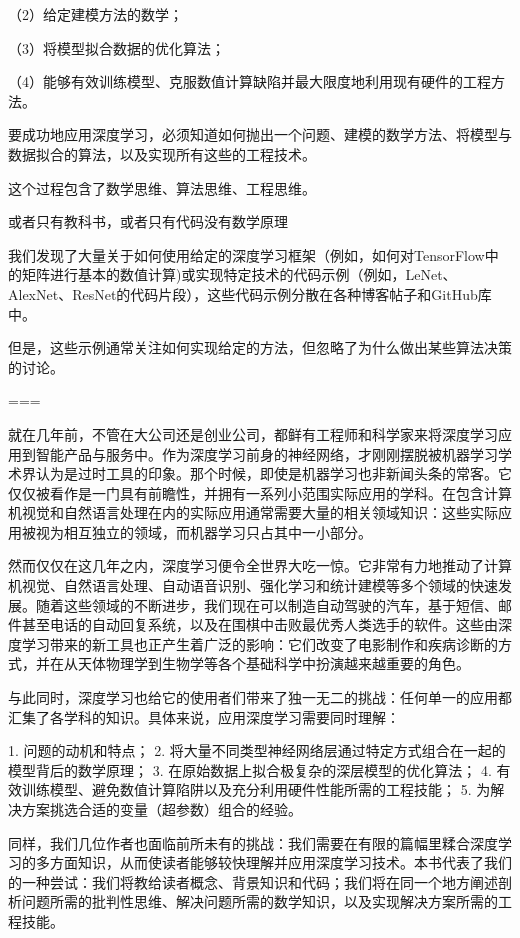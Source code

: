 （2）给定建模方法的数学；

（3）将模型拟合数据的优化算法；

（4）能够有效训练模型、克服数值计算缺陷并最大限度地利用现有硬件的工程方法。

要成功地应用深度学习，必须知道如何抛出一个问题、建模的数学方法、将模型与数据拟合的算法，以及实现所有这些的工程技术。

这个过程包含了数学思维、算法思维、工程思维。



或者只有教科书，或者只有代码没有数学原理

我们发现了大量关于如何使用给定的深度学习框架（例如，如何对TensorFlow中的矩阵进行基本的数值计算)或实现特定技术的代码示例（例如，LeNet、AlexNet、ResNet的代码片段），这些代码示例分散在各种博客帖子和GitHub库中。

但是，这些示例通常关注如何实现给定的方法，但忽略了为什么做出某些算法决策的讨论。

===

就在几年前，不管在大公司还是创业公司，都鲜有工程师和科学家来将深度学习应用到智能产品与服务中。作为深度学习前身的神经网络，才刚刚摆脱被机器学习学术界认为是过时工具的印象。那个时候，即使是机器学习也非新闻头条的常客。它仅仅被看作是一门具有前瞻性，并拥有一系列小范围实际应用的学科。在包含计算机视觉和自然语言处理在内的实际应用通常需要大量的相关领域知识：这些实际应用被视为相互独立的领域，而机器学习只占其中一小部分。

然而仅仅在这几年之内，深度学习便令全世界大吃一惊。它非常有力地推动了计算机视觉、自然语言处理、自动语音识别、强化学习和统计建模等多个领域的快速发展。随着这些领域的不断进步，我们现在可以制造自动驾驶的汽车，基于短信、邮件甚至电话的自动回复系统，以及在围棋中击败最优秀人类选手的软件。这些由深度学习带来的新工具也正产生着广泛的影响：它们改变了电影制作和疾病诊断的方式，并在从天体物理学到生物学等各个基础科学中扮演越来越重要的角色。

与此同时，深度学习也给它的使用者们带来了独一无二的挑战：任何单一的应用都汇集了各学科的知识。具体来说，应用深度学习需要同时理解：

1. 问题的动机和特点；
2. 将大量不同类型神经网络层通过特定方式组合在一起的模型背后的数学原理；
3. 在原始数据上拟合极复杂的深层模型的优化算法；
4. 有效训练模型、避免数值计算陷阱以及充分利用硬件性能所需的工程技能；
5. 为解决方案挑选合适的变量（超参数）组合的经验。

同样，我们几位作者也面临前所未有的挑战：我们需要在有限的篇幅里糅合深度学习的多方面知识，从而使读者能够较快理解并应用深度学习技术。本书代表了我们的一种尝试：我们将教给读者概念、背景知识和代码；我们将在同一个地方阐述剖析问题所需的批判性思维、解决问题所需的数学知识，以及实现解决方案所需的工程技能。


